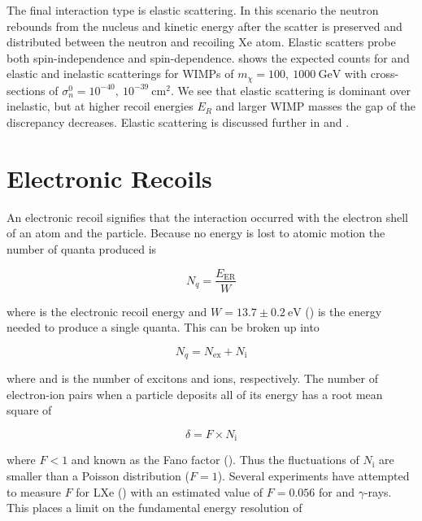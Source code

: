 The final interaction type is elastic scattering.  In this scenario the neutron rebounds from the nucleus and kinetic energy after the
scatter is preserved and distributed between the neutron and recoiling Xe atom.  Elastic scatters probe both spin-independence
and spin-dependence.   shows the expected counts for  and  elastic and
inelastic scatterings for WIMPs of $m_{\chi} = 100,\ 1000\ \mathrm{GeV}$ with cross-sections of
$\sigma_{n}^{0} = 10^{-40},\ 10^{-39}\ \mathrm{cm^{2}}$.  We see that elastic scattering is dominant over inelastic, but at higher recoil
energies $E_{R}$ and larger WIMP masses the gap of the discrepancy decreases.  Elastic scattering is discussed further in
 and \chapref{}.


\section{Electronic Recoils}
\label{sec:er}
An electronic recoil signifies that the interaction occurred with the electron shell of an atom and the particle.  Because no energy
is lost to atomic motion the number of quanta produced is

\begin{equation}
N_{q} = \frac{E_{\mathrm{ER}}}{W}
\label{eq:nquant_er}
\end{equation}

\noindent where \energyer is the electronic recoil energy
and $W = 13.7 \pm 0.2\ \mathrm{eV}$ () is the energy needed to produce a single quanta.  This can be broken up into

\begin{equation}
N_{q} = N_{\mathrm{ex}} + N_{\mathrm{i}}
\label{eq:quanta}
\end{equation}

\noindent where \nex and \nion is the number of excitons and ions, respectively.  The number of electron-ion pairs when a particle
deposits all of its energy has a root mean square of

\begin{equation}
\delta = F \times N_{\mathrm{i}}
\label{eq:fano}
\end{equation}

\noindent where $F < 1$ and known as the Fano factor ().  Thus the fluctuations of $N_{\mathrm{i}}$ are smaller than a
Poisson
distribution ($F = 1$).  Several experiments have attempted to measure $F$ for LXe () with an
estimated value of $F = 0.056$ for \electron and $\gamma$-rays.  This places a limit on the fundamental energy resolution of

